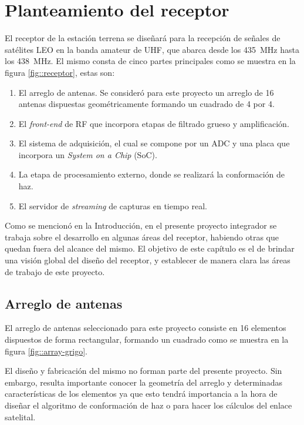 \documentclass[../../main.tex]{subfiles}
\begin{document}
\graphicspath{{./figures}}
\chapter{Planteamiento del receptor}
El receptor de la estación terrena se diseñará para la recepción de señales de satélites LEO en la banda amateur de UHF, que abarca desde los 435~MHz hasta los 438~MHz. El mismo consta de cinco partes principales como se muestra en la figura \ref{fig::receptor}, estas son:

\begin{enumerate}
    \item El arreglo de antenas. Se consideró para este proyecto un arreglo de 16 antenas dispuestas geométricamente formando un cuadrado de 4 por 4.
    \item El \textit{front-end} de RF que incorpora etapas de filtrado grueso y amplificación.
    \item El sistema de adquisición, el cual se compone por un ADC y una placa que incorpora un \textit{System on a Chip} (SoC).
    \item La etapa de procesamiento externo, donde se realizará la conformación de haz.
    \item El servidor de \textit{streaming} de capturas en tiempo real.
\end{enumerate} 

Como se mencionó en la Introducción, en el presente proyecto integrador se trabaja sobre el desarrollo en algunas áreas del receptor, habiendo otras que quedan fuera del alcance del mismo. El objetivo de este capítulo es el de brindar una visión global del diseño del receptor, y establecer de manera clara las áreas de trabajo de este proyecto.


\section{Arreglo de antenas}
El arreglo de antenas seleccionado para este proyecto consiste en 16 elementos dispuestos de forma rectangular, formando un cuadrado como se muestra en la figura \ref{fig::array-grigo}.

El diseño y fabricación del mismo no forman parte del presente proyecto. Sin embargo, resulta importante conocer la geometría del arreglo y determinadas características de los elementos ya que esto tendrá importancia a la hora de diseñar el algoritmo de conformación de haz o para hacer los cálculos del enlace satelital.
\end{document}
